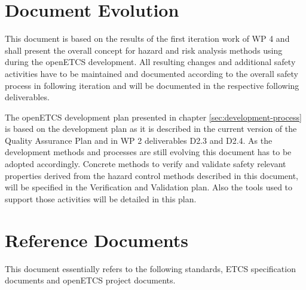 \documentclass{template/openetcs_report}
\begin{document}
\section{Document Evolution}

This document is based on the results of the first iteration work of WP 4 and shall present the overall concept for hazard and risk analysis methods using during the openETCS development. All resulting changes and additional safety activities have to be maintained and documented according to the overall safety process in following iteration and will be documented in the respective following deliverables. 

The openETCS development plan presented in chapter \ref{sec:development-process} is based on the development plan as it is described in the current version of the Quality Assurance Plan and in WP 2 deliverables D2.3 and D2.4. As the development methods and processes are still evolving this document has to be adopted accordingly. Concrete methods to verify and validate safety relevant properties derived from the hazard control methods described in this document, will be specified in the Verification and Validation plan. Also the tools used to support those activities will be detailed in this plan.

\section{Reference Documents}
\label{sec:refdoc}

This document essentially refers to the following standards, ETCS specification documents and openETCS project documents.
\end{document}
